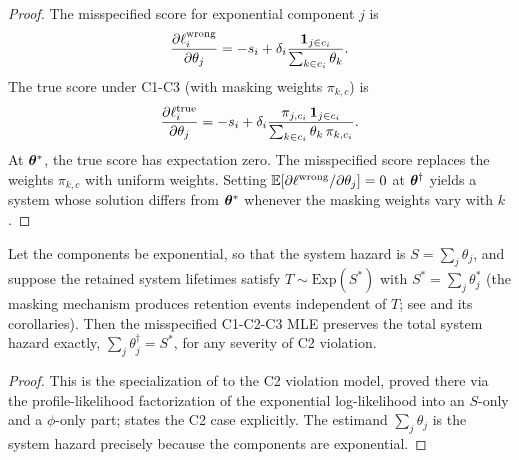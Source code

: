\begin{proof}
The misspecified score for exponential component $j$ is
\begin{equation}
    \frac{\partial \ell_i^{\mathrm{wrong}}}{\partial \theta_j} = -s_i +
    \delta_i\frac{\mathbf{1}_{j \in c_i}}{\sum_{k \in c_i} \theta_k}.
\end{equation}
The true score under C1-C3 (with masking weights $\pi_{k,c}$) is
\begin{equation}
    \frac{\partial \ell_i^{\mathrm{true}}}{\partial \theta_j} = -s_i +
    \delta_i\frac{\pi_{j,c_i}\,\mathbf{1}_{j \in c_i}}
         {\sum_{k \in c_i} \theta_k\,\pi_{k,c_i}}.
\end{equation}
At $\bm{\theta}^*$, the true score has expectation zero. The misspecified score
replaces the weights $\pi_{k,c}$ with uniform weights. Setting
$\mathbb{E}[\partial\ell^{\mathrm{wrong}}/\partial\theta_j] = 0$ at
$\bm{\theta}^{\dagger}$ yields a system whose solution differs from $\bm{\theta}^*$
whenever the masking weights vary with $k$.
\end{proof}

\begin{proposition}
\label{prop:hazard-robust}
Let the components be exponential, so that the system hazard is
$S = \sum_j \theta_j$, and suppose the retained system lifetimes satisfy
$T \sim \mathrm{Exp}(S^*)$ with $S^* = \sum_j \theta_j^*$ (the
masking mechanism produces retention events independent of $T$; see
 and its corollaries). Then the
misspecified C1-C2-C3 MLE preserves the total system hazard exactly,
$\sum_j \theta_j^{\dagger} = S^*$, for any severity of C2 violation.
\end{proposition}

\begin{proof}
This is the specialization of  to the C2
violation model, proved there via the profile-likelihood
factorization of the exponential log-likelihood into an $S$-only and a
$\phi$-only part;  states the C2 case
explicitly. The estimand $\sum_j \theta_j$ is the system hazard
precisely because the components are exponential.
\end{proof}

